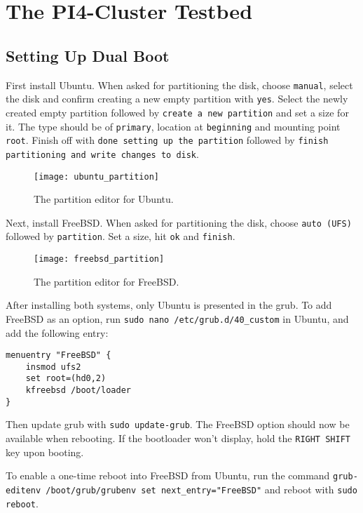 \chapter{The PI4-Cluster Testbed}

\section{Setting Up Dual Boot}

First install Ubuntu. When asked for partitioning the disk, choose \lstinline{manual}, select the disk and confirm creating a new empty partition with \lstinline{yes}. Select the newly created empty partition followed by \lstinline{create a new partition} and set a size for it. The type should be of \lstinline{primary}, location at \lstinline{beginning} and mounting point \lstinline{root}. Finish off with \lstinline{done setting up the partition} followed by \lstinline{finish partitioning and write changes to disk}.

\begin{figure}[H]
    \centering
    \texttt{[image: ubuntu\_partition]}
    \captionsetup{width=0.75\linewidth}
    \caption{The partition editor for Ubuntu.}
    \label{fig:ubuntu_partition}
\end{figure}

Next, install FreeBSD. When asked for partitioning the disk, choose \lstinline{auto (UFS)} followed by \lstinline{partition}. Set a size, hit \lstinline{ok} and \lstinline{finish}.

\begin{figure}[H]
    \centering
    \texttt{[image: freebsd\_partition]}
    \captionsetup{width=0.75\linewidth}
    \caption{The partition editor for FreeBSD.}
    \label{fig:freebsd_partition}
\end{figure}

After installing both systems, only Ubuntu is presented in the \gls{grub}. To add FreeBSD as an option, run \lstinline{sudo nano /etc/grub.d/40_custom} in Ubuntu, and add the following entry:

\begin{lstlisting}
menuentry "FreeBSD" {
    insmod ufs2
    set root=(hd0,2)
    kfreebsd /boot/loader
}
\end{lstlisting}

Then update \gls{grub} with \lstinline{sudo update-grub}. The FreeBSD option should now be available when rebooting. If the bootloader won't display, hold the \lstinline{RIGHT SHIFT} key upon booting.

To enable a one-time reboot into FreeBSD from Ubuntu, run the command \lstinline{grub-editenv /boot/grub/grubenv set next_entry="FreeBSD"} and reboot with \lstinline{sudo reboot}.